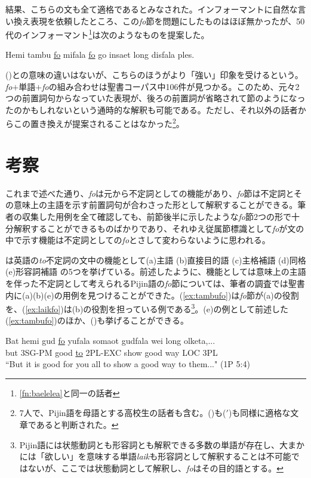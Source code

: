 結果、こちらの文も全て適格であるとみなされた。インフォーマントに自然な言い換え表現を依頼したところ、この\textit{fo}節を問題にしたものはほぼ無かったが、50代のインフォーマント\footnote{\ref{fn:baelelea}と同一の話者}は次のようなものを提案した。

\begin{exe}
 Hemi tambu \underline{fo} mifala \underline{fo} go insaet long disfala ples.
\end{exe}

()との意味の違いはないが、こちらのほうがより「強い」印象を受けるという。\textit{fo}$+$単語$+$\textit{fo}の組み合わせは聖書コーパス中106件が見つかる。このため、元々2つの前置詞句からなっていた表現が、後ろの前置詞が省略されて節のようになったのかもしれないという通時的な解釈も可能である。ただし、それ以外の話者からこの置き換えが提案されることはなかった\footnote{7人で、Pijin語を母語とする高校生の話者も含む。()も($'$)も同様に適格な文章であると判断された。}。
\section{考察}
これまで述べた通り、\textit{fo}は元から不定詞としての機能があり、\textit{fo}節は不定詞とその意味上の主語を示す前置詞句が合わさった形として解釈することができる。筆者の収集した用例を全て確認しても、前節後半に示したような\textit{fo}節2つの形で十分解釈することができるものばかりであり、それゆえ従属節標識として\textit{fo}が文の中で示す機能は不定詞としての\textit{fo}とさして変わらないように思われる。

\cite{english}は英語の\textit{to}不定詞の文中の機能として(a)主語 (b)直接目的語 (c)主格補語 (d)同格 (e)形容詞補語 の5つを挙げている。前述したように、機能としては意味上の主語を伴った不定詞として考えられるPijin語の\textit{fo}節については、筆者の調査では聖書内に(a)(b)(e)の用例を見つけることができた。(\ref{ex:tambufo})は\textit{fo}節が(a)の役割を、(\ref{ex:laikfo})は(b)の役割を担っている例である\footnote{Pijin語には状態動詞とも形容詞とも解釈できる多数の単語が存在し\cite[xvi]{dictionary}、大まかには「欲しい」を意味する単語\textit{laik}も形容詞として解釈することは不可能ではないが、ここでは状態動詞として解釈し、\textit{fo}はその目的語とする。
}。(e)の例として前述した(\ref{ex:tambufo})のほか、()も挙げることができる。

\begin{exe}
  \ex
  \gll Bat hemi gud \underline{fo} yufala somaot gudfala wei long olketa,...\\
  but 3SG-PM good \underline{to} 2PL-EXC show good way LOC 3PL\\
  \glt ``But it is good for you all to show a good way to them..." (1P 5:4)
\end{exe}

